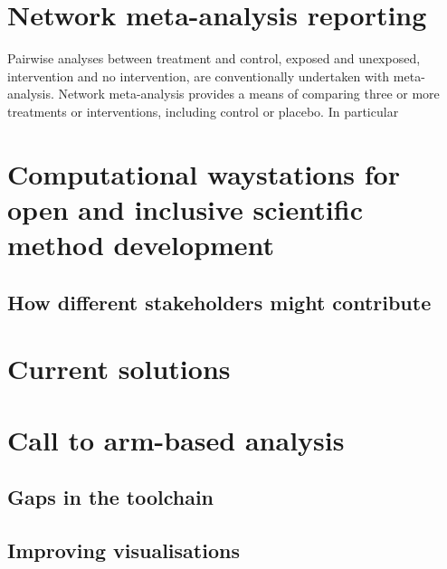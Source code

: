 \documentclass[AMA,STIX1COL]{WileyNJD-v2}\usepackage[]{graphicx}\usepackage[]{color}
\begin{document}
\maketitle



\section{Network meta-analysis reporting}\label{sec:nma}


Pairwise analyses between treatment and control, exposed and unexposed, intervention and no intervention, are conventionally undertaken with meta-analysis. Network meta-analysis provides a means of comparing three or more treatments or interventions, including control or placebo. In particular

\section{Computational waystations for open and inclusive scientific method development}\label{sec:comp}



\subsection{How different stakeholders might contribute}

\section{Current solutions}\label{sec:solutions}

\section{Call to arm-based analysis}

\subsection{Gaps in the toolchain}

\subsection{Improving visualisations}
\end{document}
